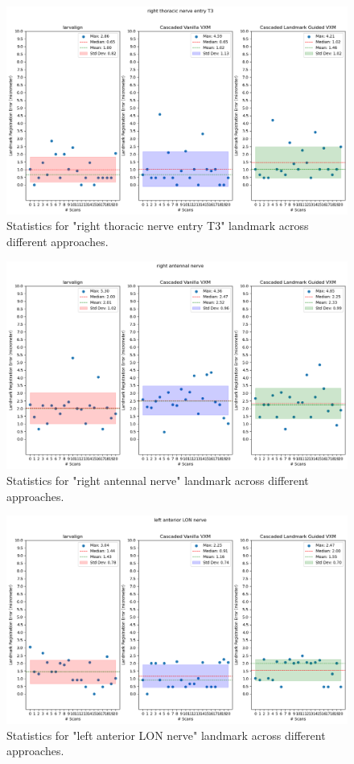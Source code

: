 \documentclass{report}
\begin{document}
\begin{figure}[h!]
	\centering
	\includegraphics[width=0.7\columnwidth]{resources/chapter5_fresh/output/right thoracic nerve entry T3.png}
	\caption{Statistics for "right thoracic nerve entry T3" landmark across different approaches.}
	\label{fig:landmark8}
\end{figure}

\begin{figure}[h!]
	\centering
	\includegraphics[width=0.7\columnwidth]{resources/chapter5_fresh/output/right antennal nerve.png}
	\caption{Statistics for "right antennal nerve" landmark across different approaches.}
	\label{fig:landmark9}
\end{figure}

\begin{figure}[h!]
	\centering
	\includegraphics[width=0.7\columnwidth]{resources/chapter5_fresh/output/left anterior LON nerve.png}
	\caption{Statistics for "left anterior LON nerve" landmark across different approaches.}
	\label{fig:landmark10}
\end{figure}
\end{document}
